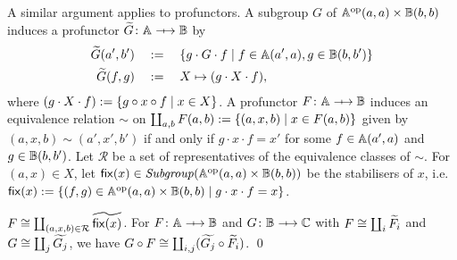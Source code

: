 A similar argument applies to profunctors.
A subgroup \( G \) of \( \mathbb{A}^{\mathrm{op}}(a,a) \times \mathbb{B}(b,b) \) induces a profunctor \( \InducedProf{G} \colon \Grp \profarrow \Grpb \) by 
\begin{align*}
    \widetilde{G}(a', b')
    &\quad:=\quad
    \{ g \cdot G \cdot f \mid f \in \mathbb{A}(a', a), g \in \mathbb{B}(b, b') \}
    \\
    \widetilde{G}(f, g)
    &\quad:=\quad
    X \mapsto (g \cdot X \cdot f),
\end{align*}
where \( (g \cdot X \cdot f) := \{ g \circ x \circ f \mid x \in X \} \).
A profunctor \( F \colon \Grp \profarrow \Grpb \) induces an equivalence relation \( \sim \) on \( \coprod_{a,b} F(a,b) := \{ (a, x, b) \mid x \in F(a, b) \} \) given by
\( (a, x, b) \sim (a', x', b') \) if and only if \( g \cdot x \cdot f = x' \) for some \( f \in \mathbb{A}(a', a) \) and \( g \in \mathbb{B}(b, b') \).
Let \( \mathcal{R} \) be a set of representatives of the equivalence classes of \( \sim \).
For \( (a, x) \in X \), let \( \mathsf{fix}(x) \in \mathit{Subgroup}(\mathbb{A}^{\mathrm{op}}(a,a) \times \mathbb{B}(b,b)) \) be the stabilisers of \( x \), i.e.~\( \mathsf{fix}(x) := \{ (f,g) \in \mathbb{A}^{\mathrm{op}}(a,a) \times \mathbb{B}(b,b) \mid g \cdot x \cdot f = x \} \).

\begin{proposition}
    \( F \cong \coprod_{(a,x,b) \in \mathcal{R}} \widetilde{\mathsf{fix}(x)} \).
    For \( F \colon \Grp \profarrow \Grpb \) and \( G \colon \Grpb \profarrow \Grpc \) with \( F \cong \coprod_i \widetilde{F_i} \) and \( G \cong \coprod_j \widetilde{G_j} \), we have \( G \circ F \cong \coprod_{i,j} (\widetilde{G_j} \circ \widetilde{F_i}) \).
    \qed
\end{proposition}


